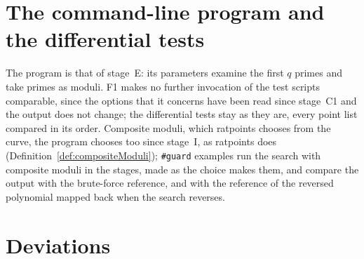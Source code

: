 \section{The command-line program and the differential tests}\label{sec:tablesCli}

The program is that of stage~E: its parameters examine the first $q$ primes and take primes as
moduli. F1 makes no further invocation of the test scripts comparable, since the options that it
concerns have been read since stage~C1 and the output does not change; the differential tests stay
as they are, every point list compared in its order. Composite moduli, which ratpoints chooses from
the curve, the program chooses too since stage~I, as ratpoints does
(Definition~\ref{def:compositeModuli}); \verb|#guard| examples run the search with composite moduli
in the stages, made as the choice makes them, and compare the output with the brute-force reference,
and with the reference of the reversed polynomial mapped back when the search reverses.

\section{Deviations}\label{sec:tablesDeviations}

